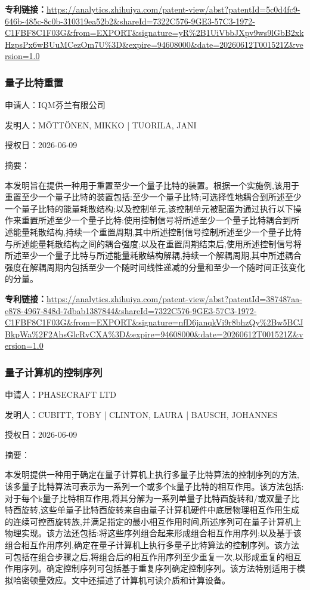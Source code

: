 \documentclass[12pt,a4paper]{ctexart}
\begin{document}
\noindent\textbf{专利链接：}\url{https://analytics.zhihuiya.com/patent-view/abst?patentId=5c0d4fc9-646b-485c-8c0b-310319ea52b2&shareId=7322C576-9GE3-57C3-1972-C1FBF8C1F03G&from=EXPORT&signature=yR%2B1UiVbbJXpv9ws9lGbB2xkHzpsPx6wBUuMCezOm7U%3D&expire=94608000&date=20260612T001521Z&version=1.0}

\subsubsection{ 量子比特重置 }

申请人：IQM芬兰有限公司

发明人：MÖTTÖNEN, MIKKO | TUORILA, JANI

授权日：2026-06-09

摘要：

本发明旨在提供一种用于重置至少一个量子比特的装置。根据一个实施例,该用于重置至少一个量子比特的装置包括:至少一个量子比特;可选择性地耦合到所述至少一个量子比特的能量耗散结构;以及控制单元,该控制单元被配置为通过执行以下操作来重置所述至少一个量子比特:使用控制信号将所述至少一个量子比特耦合到所述能量耗散结构,持续一个重置周期,其中所述控制信号控制所述至少一个量子比特与所述能量耗散结构之间的耦合强度;以及在重置周期结束后,使用所述控制信号将所述至少一个量子比特与所述能量耗散结构解耦,持续一个解耦周期,其中所述耦合强度在解耦周期内包括至少一个随时间线性递减的分量和至少一个随时间正弦变化的分量。

\noindent\textbf{专利链接：}\url{https://analytics.zhihuiya.com/patent-view/abst?patentId=387487aa-e878-4967-848d-7dbab1387844&shareId=7322C576-9GE3-57C3-1972-C1FBF8C1F03G&from=EXPORT&signature=nfD6janqkVi9r8bhzQy%2Bw5BCJBkpWa%2F2AhsGlcRvCXA%3D&expire=94608000&date=20260612T001521Z&version=1.0}

\subsubsection{ 量子计算机的控制序列 }

申请人：PHASECRAFT LTD

发明人：CUBITT, TOBY | CLINTON, LAURA | BAUSCH, JOHANNES

授权日：2026-06-09

摘要：

本发明提供一种用于确定在量子计算机上执行多量子比特算法的控制序列的方法,该多量子比特算法可表示为一系列一个或多个k量子比特的相互作用。该方法包括:对于每个k量子比特相互作用,将其分解为一系列单量子比特酉旋转和/或双量子比特酉旋转,这些单量子比特酉旋转来自由量子计算机硬件中底层物理相互作用生成的连续可控酉旋转族,并满足指定的最小相互作用时间,所述序列可在量子计算机上物理实现。该方法还包括:将这些序列组合起来形成组合相互作用序列;以及基于该组合相互作用序列,确定在量子计算机上执行多量子比特算法的控制序列。该方法可包括在组合步骤之后,将组合后的相互作用序列至少重复一次,以形成重复的相互作用序列。确定控制序列可包括基于重复序列确定控制序列。该方法特别适用于模拟哈密顿量效应。文中还描述了计算机可读介质和计算设备。
\end{document}
